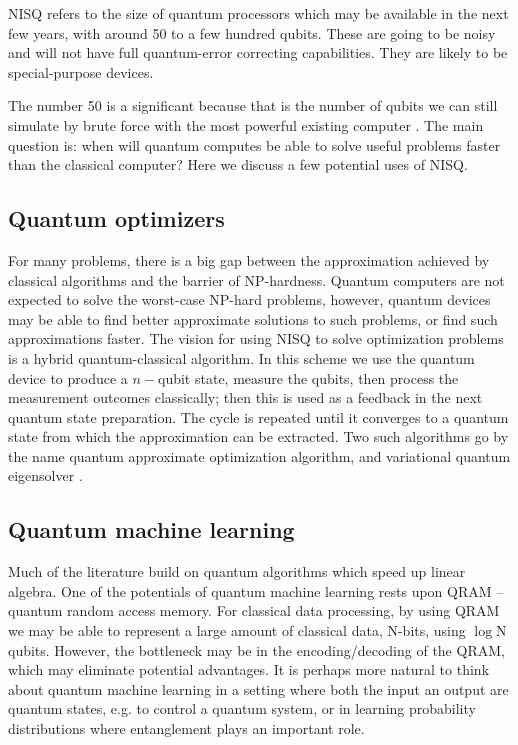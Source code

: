NISQ refers to the size of quantum processors which may be available in the next few years, with around 50 to a few hundred qubits. These are going to be noisy and will not have full quantum-error correcting capabilities. They are likely to be special-purpose devices.

 The number 50 is a significant because that is the number of qubits we can still simulate by brute force with the most powerful existing computer \cite{}. The main question is: when will quantum computes be able to solve useful problems faster than the classical computer?
Here we discuss a few potential uses of NISQ.


\subsection{Quantum optimizers}
For many problems, there is a big gap between the approximation achieved by classical algorithms and the barrier of NP-hardness. Quantum computers are not expected to solve the worst-case NP-hard problems, however, quantum devices may be able to find better approximate solutions to such problems, or find such approximations faster. The vision for using NISQ to solve optimization problems is a hybrid quantum-classical algorithm. In this scheme we use the quantum device to produce a $n-$qubit state, measure the qubits, then process the measurement outcomes classically; then this is used as a feedback in the next quantum state preparation. The cycle is repeated until it converges to a quantum state from which the approximation can be extracted. Two such algorithms go by the name quantum approximate optimization algorithm\cite{farhi2014quantum}, and variational quantum eigensolver \cite{mcclean2016theory}.


\subsection{Quantum machine learning}
Much of the literature build on quantum algorithms which speed up linear algebra\cite{biamonte2017quantum}.
One of the potentials of quantum machine learning rests upon QRAM -- quantum random access memory. For classical data processing, by using QRAM we may be able to represent a large amount of classical data, N-bits, using $\log$N qubits. However, the bottleneck may be in the encoding/decoding of the QRAM, which may eliminate potential advantages. 
It is perhaps more natural to think about quantum machine learning in a setting where both the input an output are quantum states, e.g. to control a quantum system, or in learning probability distributions where entanglement plays an important role.

